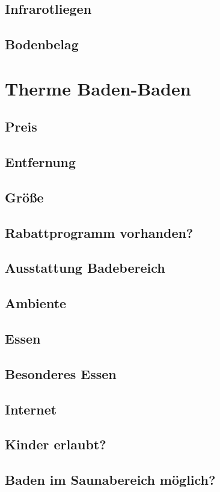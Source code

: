 \documentclass{article}
\begin{document}
\subsection*{Infrarotliegen}
\subsection*{Bodenbelag}
\pagebreak

\section*{Therme Baden-Baden}
\subsection*{Preis}
\subsection*{Entfernung}
\subsection*{Größe}
\subsection*{Rabattprogramm vorhanden?}
\subsection*{Ausstattung Badebereich}
\subsection*{Ambiente}
\subsection*{Essen}
\subsection*{Besonderes Essen}
\subsection*{Internet}
\subsection*{Kinder erlaubt?}
\subsection*{Baden im Saunabereich möglich?}
\end{document}
